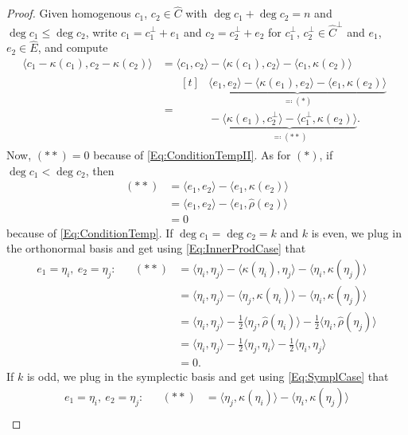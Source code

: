 \documentclass[\MainFolder/Text.tex]{subfiles}
\begin{document}
\begin{proof}
Given homogenous $c_1$, $c_2\in \hat{C}$ with $\deg c_1 + \deg c_2 = n$ and $\deg c_1 \le \deg c_2$, write $c_1 = c^\perp_1 + e_1$ and $c_2 = c^\perp_2 + e_2$ for $c_1^\perp$, $c_2^\perp \in \hat{C}^\perp$ and $e_1$, $e_2\in\hat{E}$, and compute
\begin{align*}
\langle c_1 - \kappa(c_1), c_2 - \kappa(c_2) \rangle &= \langle c_1, c_2 \rangle - \langle \kappa(c_1), c_2 \rangle - \langle c_1, \kappa(c_2) \rangle\\
&=\begin{aligned}[t]
&\underbrace{\langle e_1, e_2 \rangle - \langle \kappa(e_1), e_2 \rangle - \langle e_1, \kappa(e_2) \rangle}_{\eqqcolon(*)} \\ &{}-\underbrace{\langle\kappa(e_1),c_2^\perp\rangle - \langle c_1^\perp, \kappa(e_2)\rangle}_{\eqqcolon(**)}.
\end{aligned}
\end{align*}
Now, $(**)=0$ because of \eqref{Eq:ConditionTempII}.
As for $(*)$, if $\deg c_1 < \deg c_2$, then
\begin{align*}
(**) &= \langle e_1, e_2 \rangle - \langle e_1,\kappa(e_2)\rangle \\
     &= \langle e_1, e_2 \rangle - \langle e_1,\hat{\rho}(e_2)\rangle \\ 
     &= 0
\end{align*}
because of \eqref{Eq:ConditionTemp}.
If $\deg c_1 = \deg c_2 = k$ and $k$ is even, we plug in the orthonormal basis and get using \eqref{Eq:InnerProdCase} that
\begin{align*}
e_1 = \eta_i,\ e_2 = \eta_j:  && (**) &= \langle \eta_i, \eta_j \rangle - \langle \kappa(\eta_i),\eta_j\rangle - \langle \eta_i,\kappa(\eta_j)\rangle \\
&& & = \langle \eta_i, \eta_j\rangle - \langle \eta_j, \kappa(\eta_i)\rangle - \langle \eta_i, \kappa(\eta_j)\rangle \\
&& & = \langle \eta_i, \eta_j \rangle - \frac{1}{2}\langle \eta_j, \hat{\rho}(\eta_i)\rangle - \frac{1}{2}\langle\eta_i,\hat{\rho}(\eta_j)\rangle\\
&& & = \langle \eta_i, \eta_j \rangle - \frac{1}{2}\langle \eta_j, \eta_i \rangle - \frac{1}{2}\langle \eta_i, \eta_j \rangle \\
&& & = 0.
\end{align*}
If $k$ is odd, we plug in the symplectic basis and get using \eqref{Eq:SymplCase} that
\begin{align*}
e_1 = \eta_i,\ e_2 = \eta_j: && (**) &= \langle \eta_j, \kappa(\eta_i) \rangle - \langle \eta_i, \kappa(\eta_j) \rangle \\

\end{align*}
\end{proof}
\end{document}
